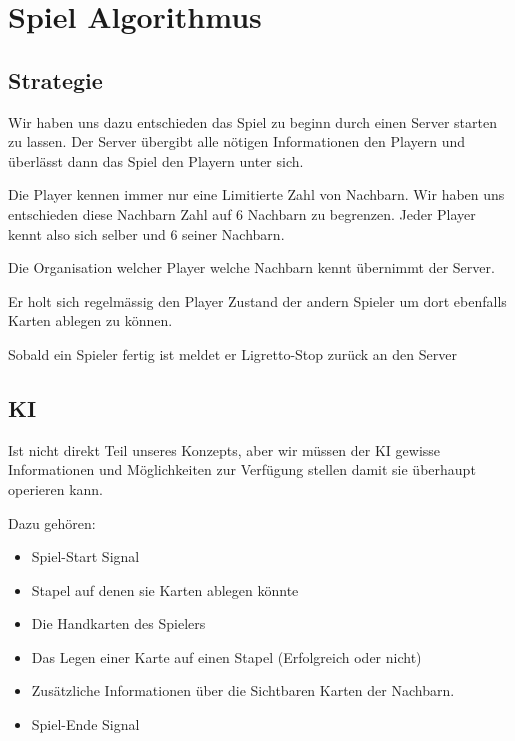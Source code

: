 \section{Spiel Algorithmus} 


\subsection{Strategie}

Wir haben uns dazu entschieden das Spiel zu beginn durch einen Server starten zu lassen. Der Server übergibt alle nötigen Informationen den Playern und überlässt dann das Spiel den Playern unter sich.

Die Player kennen immer nur eine Limitierte Zahl von Nachbarn. Wir haben uns entschieden diese Nachbarn Zahl auf 6 Nachbarn zu begrenzen. Jeder Player kennt also sich selber und 6 seiner Nachbarn.

Die Organisation welcher Player welche Nachbarn kennt übernimmt der Server.

Er holt sich regelmässig den Player Zustand der andern Spieler um dort ebenfalls Karten ablegen zu können.

Sobald ein Spieler fertig ist meldet er Ligretto-Stop zurück an den Server

\subsection{KI}

Ist nicht direkt Teil unseres Konzepts, aber wir müssen der KI gewisse Informationen und Möglichkeiten zur Verfügung stellen damit sie überhaupt operieren kann.

Dazu gehören:
\begin{itemize}
\item Spiel-Start Signal
\item Stapel auf denen sie Karten ablegen könnte
\item Die Handkarten des Spielers
\item Das Legen einer Karte auf einen Stapel (Erfolgreich oder nicht)
\item Zusätzliche Informationen über die Sichtbaren Karten der Nachbarn.
\item Spiel-Ende Signal
\end{itemize}


